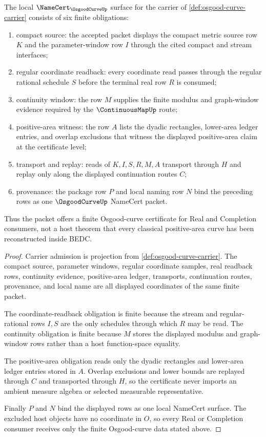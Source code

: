 \begin{theorem}
\label{thm:osgood-curve-namecert-obligations}
The local $\NameCert_{\OsgoodCurveUp}$ surface for the carrier of \autoref{def:osgood-curve-carrier} consists of six finite obligations:
\begin{enumerate}
\item compact source: the accepted packet displays the compact metric source row $K$ and the parameter-window row $I$ through the cited compact and stream interfaces;
\item regular coordinate readback: every coordinate read passes through the regular rational schedule $S$ before the terminal real row $R$ is consumed;
\item continuity window: the row $M$ supplies the finite modulus and graph-window evidence required by the $\ContinuousMapUp$ route;
\item positive-area witness: the row $A$ lists the dyadic rectangles, lower-area ledger entries, and overlap exclusions that witness the displayed positive-area claim at the certificate level;
\item transport and replay: reads of $K,I,S,R,M,A$ transport through $H$ and replay only along the displayed continuation routes $C$;
\item provenance: the package row $P$ and local naming row $N$ bind the preceding rows as one $\OsgoodCurveUp$ NameCert packet.
\end{enumerate}
Thus the packet offers a finite Osgood-curve certificate for Real and Completion consumers, not a host theorem that every classical positive-area curve has been reconstructed inside BEDC.
\end{theorem}
\begin{proof}
Carrier admission is projection from \autoref{def:osgood-curve-carrier}. The compact source, parameter windows, regular coordinate samples, real readback rows, continuity evidence, positive-area ledger, transports, continuation routes, provenance, and local name are all displayed coordinates of the same finite packet.

The coordinate-readback obligation is finite because the stream and regular-rational rows $I,S$ are the only schedules through which $R$ may be read. The continuity obligation is finite because $M$ stores the displayed modulus and graph-window rows rather than a host function-space equality.

The positive-area obligation reads only the dyadic rectangles and lower-area ledger entries stored in $A$. Overlap exclusions and lower bounds are replayed through $C$ and transported through $H$, so the certificate never imports an ambient measure algebra or selected measurable representative.

Finally $P$ and $N$ bind the displayed rows as one local NameCert surface. The excluded host objects have no coordinate in $O$, so every Real or Completion consumer receives only the finite Osgood-curve data stated above.
\end{proof}

